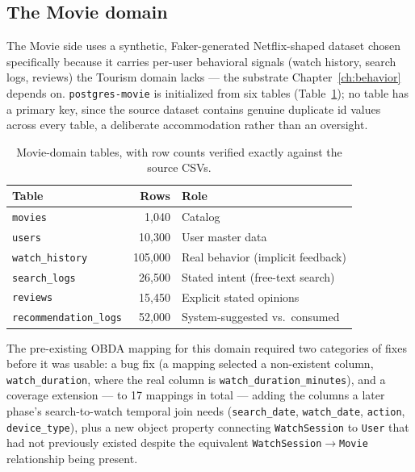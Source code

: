 \documentclass[11pt,a4paper,oneside]{book}
\newcommand{\code}[1]{\texttt{#1}}
\begin{document}
\subsection{The Movie domain}

The Movie side uses a synthetic, Faker-generated Netflix-shaped dataset chosen specifically because
it carries per-user behavioral signals (watch history, search logs, reviews) the Tourism domain
lacks --- the substrate Chapter~\ref{ch:behavior} depends on. \code{postgres-movie} is initialized
from six tables (Table~\ref{tab:arch-movie-tables}); no table has a primary key, since the source
dataset contains genuine duplicate id values across every table, a deliberate accommodation rather
than an oversight.

\begin{table}[H]
\centering
\begin{tabular}{lrl}
\toprule
\textbf{Table} & \textbf{Rows} & \textbf{Role} \\
\midrule
\code{movies}              & 1{,}040   & Catalog \\
\code{users}               & 10{,}300  & User master data \\
\code{watch\_history}       & 105{,}000 & Real behavior (implicit feedback) \\
\code{search\_logs}         & 26{,}500  & Stated intent (free-text search) \\
\code{reviews}             & 15{,}450  & Explicit stated opinions \\
\code{recommendation\_logs} & 52{,}000  & System-suggested vs.\ consumed \\
\bottomrule
\end{tabular}
\caption{Movie-domain tables, with row counts verified exactly against the source CSVs.}
\label{tab:arch-movie-tables}
\end{table}

The pre-existing OBDA mapping for this domain required two categories of fixes before it was usable:
a bug fix (a mapping selected a non-existent column, \code{watch\_duration}, where the real column
is \code{watch\_duration\_minutes}), and a coverage extension --- to 17 mappings in total --- adding
the columns a later phase's search-to-watch temporal join needs (\code{search\_date},
\code{watch\_date}, \code{action}, \code{device\_type}), plus a new object property connecting
\code{WatchSession} to \code{User} that had not previously existed despite the equivalent
\code{WatchSession}$\to$\code{Movie} relationship being present.
\end{document}
